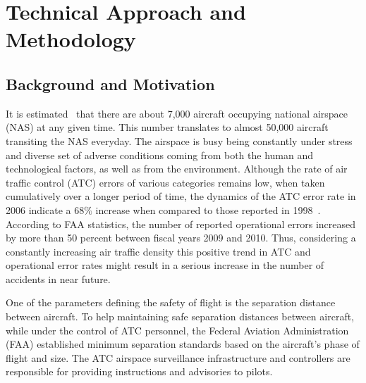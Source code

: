 \documentclass[letter,onecolumn,12pt]{aiaa-tc}
\newcommand{\1}{1_n}
\begin{document}



\section{Technical Approach and Methodology}

\subsection{Background and Motivation }
It is estimated~\cite{FAA_ATO_2013} that there are about 7,000 aircraft occupying national airspace (NAS) at any given time. This number translates to almost 50,000 aircraft transiting the NAS everyday. The airspace is busy being constantly under stress and diverse set of adverse conditions coming from both the human and technological factors, as well as from the environment. Although the rate of air traffic control (ATC) errors of various categories remains low,  when taken cumulatively over a longer period of time, the dynamics of the ATC error rate in 2006 indicate a $68\%$  increase when compared to those reported in 1998~\cite{USAToday_2006}. According to FAA statistics, the number of reported operational errors increased by more than 50 percent between fiscal years 2009 and 2010. Thus, considering a constantly increasing air traffic density this positive trend in ATC and operational error rates might result in a serious increase in the number of accidents in near future. 

One of the parameters defining the safety of flight is the separation distance between aircraft. To help maintaining safe separation distances between aircraft, while under the control of ATC personnel, the Federal Aviation Administration (FAA) established minimum separation standards based on the aircraft's phase of flight and size. The ATC airspace surveillance infrastructure and controllers are responsible for providing instructions and advisories to pilots. 
\end{document}
